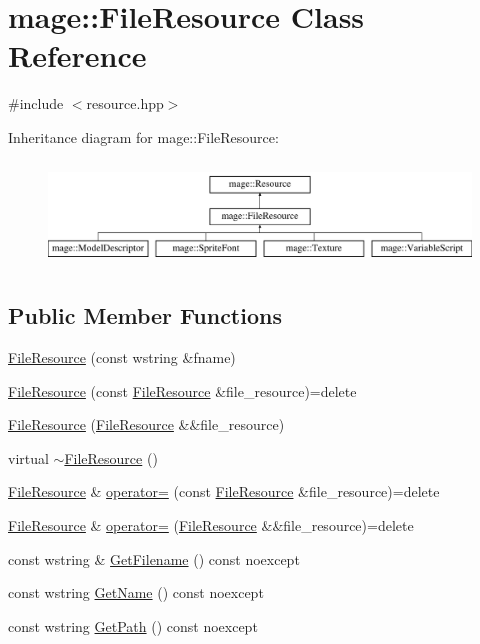\hypertarget{classmage_1_1_file_resource}{}\section{mage\+:\+:File\+Resource Class Reference}
\label{classmage_1_1_file_resource}


{\ttfamily \#include $<$resource.\+hpp$>$}

Inheritance diagram for mage\+:\+:File\+Resource\+:\begin{figure}[H]
\begin{center}
\leavevmode
\includegraphics[height=2.800000cm]{classmage_1_1_file_resource}
\end{center}
\end{figure}
\subsection*{Public Member Functions}
\begin{DoxyCompactItemize}
\item 
\hyperlink{classmage_1_1_file_resource_ab126d9301d81c55b2aaacff86437e2d4}{File\+Resource} (const wstring \&fname)
\item 
\hyperlink{classmage_1_1_file_resource_a5aa20ee42fcfc4ee6877438ed7377930}{File\+Resource} (const \hyperlink{classmage_1_1_file_resource}{File\+Resource} \&file\+\_\+resource)=delete
\item 
\hyperlink{classmage_1_1_file_resource_a8022b27741face9debe1e8ccb1bc54e3}{File\+Resource} (\hyperlink{classmage_1_1_file_resource}{File\+Resource} \&\&file\+\_\+resource)
\item 
virtual \hyperlink{classmage_1_1_file_resource_a864fc0373785b1d5a82fecdc3aee7e46}{$\sim$\+File\+Resource} ()
\item 
\hyperlink{classmage_1_1_file_resource}{File\+Resource} \& \hyperlink{classmage_1_1_file_resource_a195da42fa3a40991e7c38cf8305b0bf2}{operator=} (const \hyperlink{classmage_1_1_file_resource}{File\+Resource} \&file\+\_\+resource)=delete
\item 
\hyperlink{classmage_1_1_file_resource}{File\+Resource} \& \hyperlink{classmage_1_1_file_resource_a7ec207d6e9cb0bc4b8020aa73df986b6}{operator=} (\hyperlink{classmage_1_1_file_resource}{File\+Resource} \&\&file\+\_\+resource)=delete
\item 
const wstring \& \hyperlink{classmage_1_1_file_resource_a25607552b782ae252851311d9b07fcd7}{Get\+Filename} () const noexcept
\item 
const wstring \hyperlink{classmage_1_1_file_resource_af53d0744d4c952286b7c00d63b9f0fb8}{Get\+Name} () const noexcept
\item 
const wstring \hyperlink{classmage_1_1_file_resource_a5c7d183fb6e55d6c91b6b336c68ffc82}{Get\+Path} () const noexcept
\end{DoxyCompactItemize}


